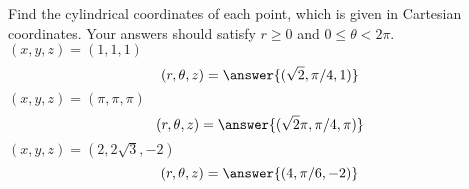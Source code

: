 \begin{problem}
Find the cylindrical coordinates of each point, which is given in Cartesian coordinates. Your answers should satisfy $r\geq 0$ and $0\leq \theta < 2\pi$.
$(x,y,z) = (1,1,1)$
\[
(r,\theta,z) = \answer{(\sqrt{2}, \pi/4, 1)}
\]
$(x,y,z) = (\pi,\pi,\pi)$
\[
(r,\theta,z) = \answer{(\sqrt{2}\pi, \pi/4, \pi)}
\]
$(x,y,z) = (2,2\sqrt{3},-2)$
\[
(r,\theta,z) = \answer{(4, \pi/6, -2)}
\]
\end{problem}